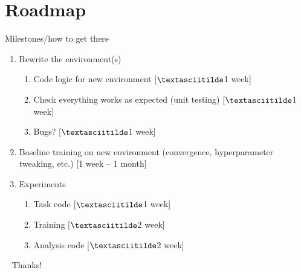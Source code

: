 \documentclass[bigger]{beamer}
\begin{document}
\section{Roadmap }
\label{sec:org4ae5ded}
\begin{frame}[<+->][label={sec:orgbd10d24}]{Milestones/how to get there}
\begin{enumerate}
\item Rewrite the environment(s) 
\begin{enumerate}
\item Code logic for new environment \colorbox{black!15!white}{[$\textasciitilde$1 week]}
\item Check everything works as expected (unit testing) \colorbox{black!15!white}{[$\textasciitilde$1 week]}
\item Bugs? \colorbox{black!15!white}{[$\textasciitilde$1 week]}
\end{enumerate}
\item Baseline training on new environment (convergence, hyperparameter tweaking, etc.)  \colorbox{black!15!white}{[1 week -- 1 month]}
\item Experiments
\begin{enumerate}
\item Task code  \colorbox{black!15!white}{[$\textasciitilde$1 week]}
\item Training  \colorbox{black!15!white}{[$\textasciitilde$2 week]}
\item Analysis code  \colorbox{black!15!white}{[$\textasciitilde$2 week]}
\end{enumerate}
\end{enumerate}
\end{frame}
\begin{frame}[label={sec:org1f6b307},standout]{~}
Thanks!
\end{frame}
\end{document}
